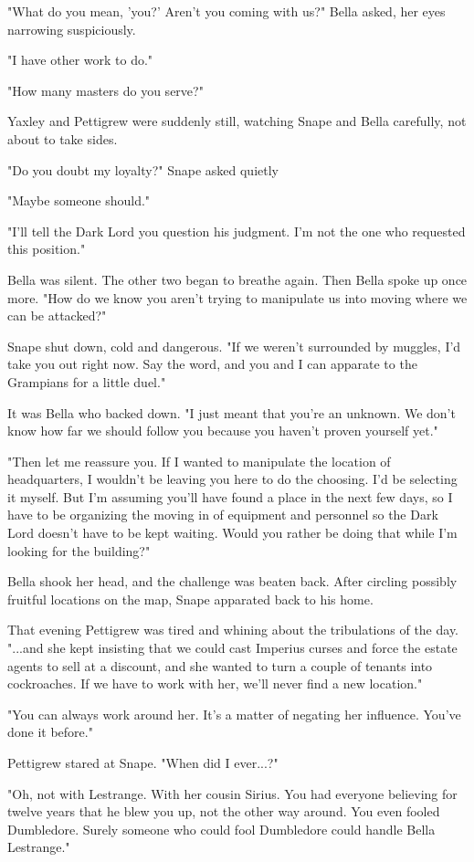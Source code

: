 \documentclass[a4paper,11pt]{article}
\begin{document}
"What do you mean, 'you?' Aren't you coming with us?" Bella asked, her eyes narrowing suspiciously.

"I have other work to do."

"How many masters do you serve?"

Yaxley and Pettigrew were suddenly still, watching Snape and Bella carefully, not about to take sides.

"Do you doubt my loyalty?" Snape asked quietly

"Maybe someone should."

"I'll tell the Dark Lord you question his judgment. I'm not the one who requested this position."

Bella was silent. The other two began to breathe again. Then Bella spoke up once more. "How do we know you aren't trying to manipulate us into moving where we can be attacked?"

Snape shut down, cold and dangerous. "If we weren't surrounded by muggles, I'd take you out right now. Say the word, and you and I can apparate to the Grampians for a little duel."

It was Bella who backed down. "I just meant that you're an unknown. We don't know how far we should follow you because you haven't proven yourself yet."

"Then let me reassure you. If I wanted to manipulate the location of headquarters, I wouldn't be leaving you here to do the choosing. I'd be selecting it myself. But I'm assuming you'll have found a place in the next few days, so I have to be organizing the moving in of equipment and personnel so the Dark Lord doesn't have to be kept waiting. Would you rather be doing that while I'm looking for the building?"

Bella shook her head, and the challenge was beaten back. After circling possibly fruitful locations on the map, Snape apparated back to his home.

That evening Pettigrew was tired and whining about the tribulations of the day. "...and she kept insisting that we could cast Imperius curses and force the estate agents to sell at a discount, and she wanted to turn a couple of tenants into cockroaches. If we have to work with her, we'll never find a new location."

"You can always work around her. It's a matter of negating her influence. You've done it before."

Pettigrew stared at Snape. "When did I ever...?"

"Oh, not with Lestrange. With her cousin Sirius. You had everyone believing for twelve years that he blew you up, not the other way around. You even fooled Dumbledore. Surely someone who could fool Dumbledore could handle Bella Lestrange."
\end{document}

